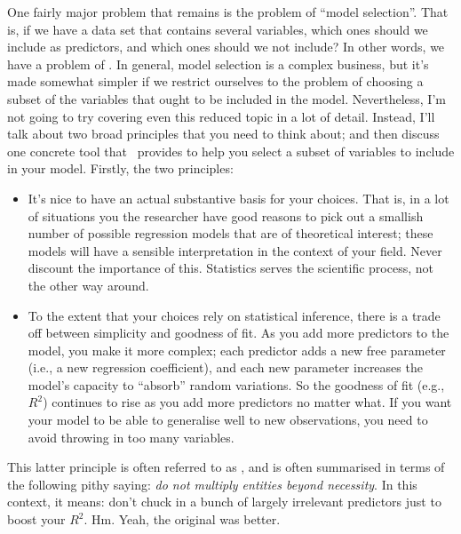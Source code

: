 One fairly major problem that remains is the problem of ``model selection''. That is, if we have a data set that contains several variables, which ones should we include as predictors, and which ones should we not include? In other words, we have a problem of . In general, model selection is a complex business, but it's made somewhat simpler if we restrict ourselves to the problem of choosing a subset of the variables that ought to be included in the model. Nevertheless, I'm not going to try covering even this reduced topic in a lot of detail. Instead, I'll talk about two broad principles that you need to think about; and then discuss one concrete tool that \R\ provides to help you select a subset of variables to include in your model. Firstly, the two principles:
\begin{itemize}
\item It's nice to have an actual substantive basis for your choices. That is, in a lot of situations you the researcher have good reasons to pick out a smallish number of possible regression models that are of theoretical interest; these models will have a sensible interpretation in the context of your field. Never discount the importance of this. Statistics serves the scientific process, not the other way around. 
\item To the extent that your choices rely on statistical inference, there is a trade off between simplicity and goodness of fit. As you add more predictors to the model, you make it more complex; each predictor adds a new free parameter (i.e., a new regression coefficient), and each new parameter increases the model's capacity to ``absorb'' random variations. So the goodness of fit (e.g., $R^2$) continues to rise as you add more predictors no matter what. If you want your model to be able to generalise well to new observations, you need to avoid throwing in too many variables. 
\end{itemize}
This latter principle is often referred to as , and is often summarised in terms of the following pithy saying: {\it do not multiply entities beyond necessity}. In this context, it means: don't chuck in a bunch of largely irrelevant predictors just to boost your $R^2$. Hm. Yeah, the original was better. 

